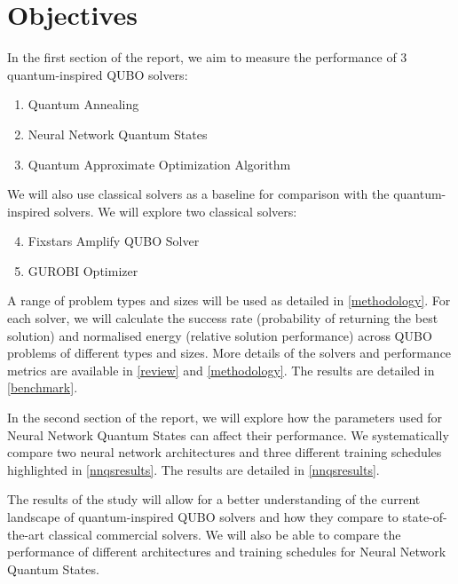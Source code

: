 \section{Objectives}
In the first section of the report, we aim to measure the performance of 3 quantum-inspired QUBO solvers:
\begin{enumerate}
    \item Quantum Annealing
    \item Neural Network Quantum States
    \item Quantum Approximate Optimization Algorithm
\end{enumerate}
We will also use classical solvers as a baseline for comparison with the quantum-inspired solvers. We will explore two classical solvers:
\begin{enumerate}
    \setcounter{enumi}{3}
    \item Fixstars Amplify QUBO Solver
    \item GUROBI Optimizer
\end{enumerate}



A range of problem types and sizes will be used as detailed in \autoref{methodology}. For each solver, we will calculate the success rate (probability of returning the best solution) and normalised energy (relative solution performance) across QUBO problems of different types and sizes. More details of the solvers and performance metrics are available in \autoref{review} and \autoref{methodology}. The results are detailed in \autoref{benchmark}.

In the second section of the report, we will explore how the parameters used for Neural Network Quantum States can affect their performance. We systematically compare two neural network architectures and three different training schedules highlighted in \autoref{nnqsresults}. The results are detailed in \autoref{nnqsresults}.

The results of the study will allow for a better understanding of the current landscape of quantum-inspired QUBO solvers and how they compare to state-of-the-art classical commercial solvers. We will also be able to compare the performance of different architectures and training schedules for Neural Network Quantum States.